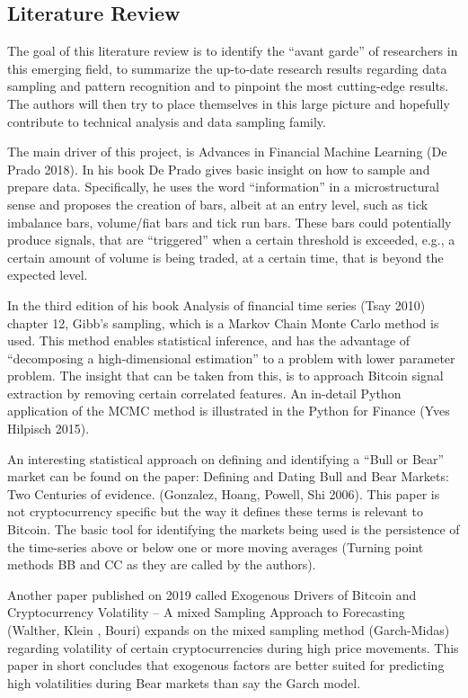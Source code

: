 \documentclass[10pt]{asme2ej}
\begin{document}
\subsection{Literature Review}

The goal of this literature review is to identify the “avant garde” of researchers in this
emerging field, to summarize the up-to-date research results regarding data sampling and
pattern recognition and to pinpoint the most cutting-edge results. The authors will then try to
place themselves in this large picture and hopefully contribute to technical analysis and data
sampling family.

The main driver of this project, is Advances in Financial Machine Learning (De Prado
2018). In his book De Prado gives basic insight on how to sample and prepare data. Specifically,
he uses the word “information” in a microstructural sense and proposes the creation of bars,
albeit at an entry level, such as tick imbalance bars, volume/fiat bars and tick run bars. These
bars could potentially produce signals, that are “triggered” when a certain threshold is
exceeded, e.g., a certain amount of volume is being traded, at a certain time, that is beyond the
expected level.

In the third edition of his book Analysis of financial time series (Tsay 2010) chapter 12,
Gibb’s sampling, which is a Markov Chain Monte Carlo method is used. This method enables
statistical inference, and has the advantage of “decomposing a high-dimensional estimation” to
a problem with lower parameter problem. The insight that can be taken from this, is to
approach Bitcoin signal extraction by removing certain correlated features. An in-detail Python
application of the MCMC method is illustrated in the Python for Finance (Yves Hilpisch 2015).

An interesting statistical approach on defining and identifying a “Bull or Bear” market
can be found on the paper: Defining and Dating Bull and Bear Markets: Two Centuries of
evidence. (Gonzalez, Hoang, Powell, Shi 2006). This paper is not cryptocurrency specific but the
way it defines these terms is relevant to Bitcoin. The basic tool for identifying the markets being
used is the persistence of the time-series above or below one or more moving averages
(Turning point methods BB and CC as they are called by the authors).

Another paper published on 2019 called Exogenous Drivers of Bitcoin and
Cryptocurrency Volatility – A mixed Sampling Approach to Forecasting (Walther, Klein , Bouri)
expands on the mixed sampling method (Garch-Midas) regarding volatility of certain
cryptocurrencies during high price movements. This paper in short concludes that exogenous
factors are better suited for predicting high volatilities during Bear markets than say the Garch
model.
\end{document}
